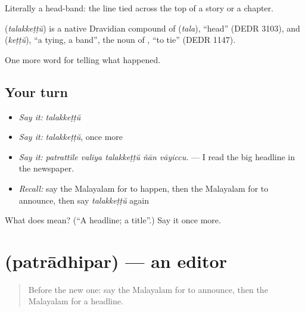 Literally a head-band: the line tied across the top of a story or a chapter.

\begin{cousinweb}
\textbf{} (\emph{talakkeṭṭŭ}) is a native Dravidian compound of  (\emph{tala}), \textquotedblleft{}head\textquotedblright{} (DEDR 3103), and  (\emph{keṭṭŭ}), \textquotedblleft{}a tying, a band\textquotedblright{}, the noun of , \textquotedblleft{}to tie\textquotedblright{} (DEDR 1147).
\end{cousinweb}

\begin{grammarlens}[title={What you've built}]
One more word for telling what happened.
\end{grammarlens}

\subsection*{Your turn}
\begin{itemize}
\raggedright
  \item \emph{Say it:} \emph{talakkeṭṭŭ}
  \item \emph{Say it:} \emph{talakkeṭṭŭ}, once more
  \item \emph{Say it:} \emph{patrattile valiya talakkeṭṭŭ ñān vāyiccu.} — I read the big headline in the newspaper.
  \item \emph{Recall:} say the Malayalam for to happen, then the Malayalam for to announce, then say \emph{talakkeṭṭŭ} again
\end{itemize}

\begin{tcolorbox}[breakable,colback=teal!4,colframe=teal!35!black,title={Before you move on}]
What does  mean? (\textquotedblleft{}A headline; a title\textquotedblright{}.) Say it once more.
\end{tcolorbox}
\section[\texorpdfstring{\ml{പത്രാധിപർ} (patrādhipar)}{പത്രാധിപർ (patrādhipar)}]{ (patrādhipar) — an editor}

\label{lesson:ML-C350-patradhipar}



\begin{quote}
Before the new one: say the Malayalam for to announce, then the Malayalam for a headline.
\end{quote}

